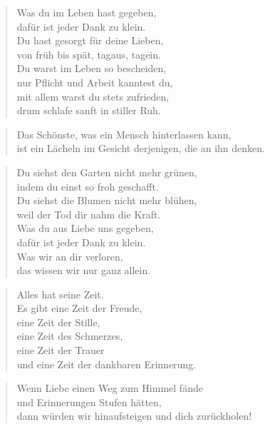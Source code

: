 \documentclass[ngerman,a4paper,11pt]{scrreprt}
\begin{document}
\begin{verse}
Was du im Leben hast gegeben, \\
dafür ist jeder Dank zu klein. \\
Du hast gesorgt für deine Lieben, \\
von früh bis spät, tagaus, tagein. \\
Du warst im Leben so bescheiden, \\
nur Pflicht und Arbeit kanntest du, \\
mit allem warst du stets zufrieden, \\
drum schlafe sanft in stiller Ruh. \\
\end{verse}

\begin{verse}
Das Schönste, was ein Mensch hinterlassen kann, \\
ist ein Lächeln im Gesicht derjenigen, die an ihn denken. \\
\end{verse}

\begin{verse}
Du siehst den Garten nicht mehr grünen, \\
indem du einst so froh geschafft. \\
Du siehst die Blumen nicht mehr blühen, \\
weil der Tod dir nahm die Kraft. \\
Was du aus Liebe uns gegeben, \\
dafür ist jeder Dank zu klein. \\
Was wir an dir verloren, \\
das wissen wir nur ganz allein. \\
\end{verse}

\begin{verse}
Alles hat seine Zeit. \\
Es gibt eine Zeit der Freude, \\
eine Zeit der Stille, \\
eine Zeit des Schmerzes, \\
eine Zeit der Trauer \\
und eine Zeit der dankbaren Erinnerung. \\
\end{verse}

\begin{verse}
Wenn Liebe einen Weg zum Himmel fände \\
und Erinnerungen Stufen hätten, \\
dann würden wir hinaufsteigen und dich zurückholen! \\
\end{verse}
\end{document}
